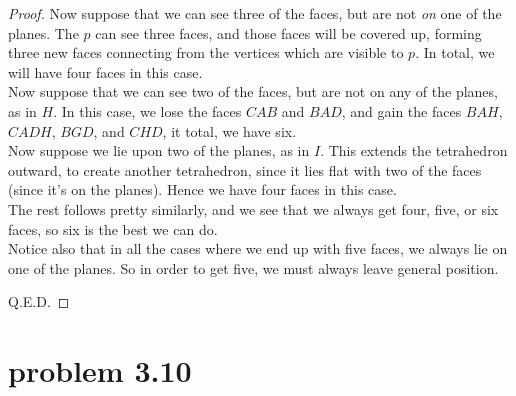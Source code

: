 \documentclass[12pt]{article}
\theoremstyle{definition}
\begin{document}
\begin{proof}
Now suppose that we can see three of the faces, but are not \textit{on} one of the planes. The $p$ can see three faces, and those faces will be covered up, forming three new faces connecting from the vertices which are visible to $p$. In total, we will have four faces in this case.\\

Now suppose that we can see two of the faces, but are not on any of the planes, as in $H$. In this case, we lose the faces $CAB$ and $BAD$, and gain the faces $BAH$, $CADH$, $BGD$, and $CHD$, it total, we have six. \\

Now suppose we lie upon two of the planes, as in $I$. This extends the tetrahedron outward, to create another tetrahedron, since it lies flat with two of the faces (since it's on the planes). Hence we have four faces in this case.\\

The rest follows pretty similarly, and we see that we always get four, five, or six faces, so six is the best we can do.\\

Notice also that in all the cases where we end up with five faces, we always lie on one of the planes. So in order to get five, we must always leave general position.

Q.E.D.


\end{proof}


\section{problem 3.10}
\end{document}
